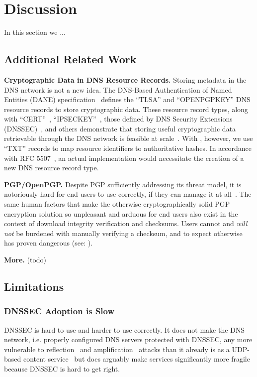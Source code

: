 \section{Discussion} \label{sec:discussion}

In this section we ...

\subsection{Additional Related Work}

\noindent\textbf{Cryptographic Data in DNS Resource Records.}    Storing
metadata in the DNS network is not a new idea. The DNS-Based Authentication of
Named Entities (DANE) specification~\cite{DANE1, DANE2, DANE3} defines the
``TLSA'' and ``OPENPGPKEY'' DNS resource records to store cryptographic data.
These resource record types, along with ``CERT''~\cite{CERT},
``IPSECKEY''~\cite{IPSECKEY}, those defined by DNS Security Extensions
(DNSSEC)~\cite{DNSSEC}, and others demonstrate that storing useful cryptographic
data retrievable through the DNS network is feasible at scale~\cite{DANE3,
DANE1}. With \SYSTEM{}, however, we use ``TXT'' records to map resource
identifiers to authoritative hashes. In accordance with RFC 5507~\cite{RFC5507},
an actual \SYSTEM{} implementation would necessitate the creation of a new DNS
resource record type.

\noindent\textbf{PGP/OpenPGP.}    Despite PGP sufficiently addressing its threat
model, it is notoriously hard for end users to use correctly, if they can manage
it at all~\cite{PGPBad}. The same human factors that make the otherwise
cryptographically solid PGP encryption solution so unpleasant and arduous for
end users also exist in the context of download integrity verification and
checksums. Users cannot and \textit{will not} be burdened with manually
verifying a checksum, and to expect otherwise has proven dangerous (see:
).

\noindent\textbf{More.}    (todo)

\subsection{Limitations}

\subsubsection{DNSSEC Adoption is Slow}

DNSSEC is hard to use and harder to use correctly. It does not make the DNS
network, i.e. properly configured DNS servers protected with DNSSEC, any more
vulnerable to reflection~\cite{Neustar} and amplification~\cite{Ariya,
DNSSEC-is-hard-1, DNSSEC-is-hard-2, DNSSEC-is-hard-3, DNSSEC-is-hard-4} attacks
than it already is as a UDP-based content service~\cite{USCERT, Vixie} but does
arguably make services significantly more fragile because DNSSEC is hard to get
right.

